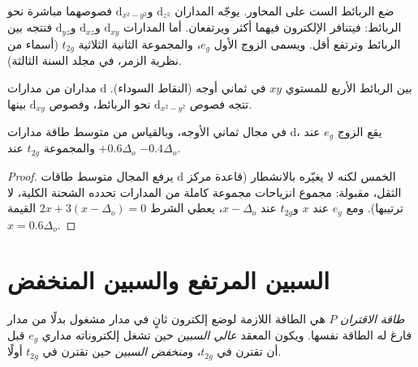 ضع الربائط الست على المحاور. يوجّه المداران $\mathrm d_{z^2}$ و$\mathrm d_{x^2-y^2}$
فصوصهما مباشرة نحو الربائط: فيتنافر الإلكترون فيهما أكثر
ويرتفعان. أما المدارات $\mathrm d_{xy}$ و$\mathrm d_{xz}$ و$\mathrm d_{yz}$ فتتجه بين
الربائط وترتفع أقل. ويسمى الزوج الأول $e_g$، والمجموعة الثانية الثلاثية
$t_{2g}$ (أسماء من نظرية الزمر، في مجلد السنة الثالثة).

\begin{omfigure}

{\small مداران من مدارات d بين الربائط الأربع للمستوي $xy$ في ثماني أوجه
(النقاط السوداء). تتجه فصوص $\mathrm d_{x^2-y^2}$ نحو الربائط، وفصوص
$\mathrm d_{xy}$ بينها.}
\end{omfigure}

\begin{theorem}\label{thm:b2:ligand-field:barycentre}
في مجال ثماني الأوجه، وبالقياس من متوسط طاقة مدارات d، يقع
الزوج $e_g$ عند $+0.6\Delta_o$ والمجموعة $t_{2g}$ عند $-0.4\Delta_o$.
\end{theorem}

\begin{proof}
يرفع المجال متوسط طاقات d الخمس لكنه لا يغيّره
بالانشطار (قاعدة مركز الثقل، مقبولة: مجموع انزياحات مجموعة كاملة من
المدارات تحدده الشحنة الكلية، لا ترتيبها). ومع $e_g$ عند $x$ 
و$t_{2g}$ عند $x - \Delta_o$، يعطي الشرط $2x + 3(x - \Delta_o) = 0$ القيمة $x = 0.6\Delta_o$.
\end{proof}

\section{السبين المرتفع والسبين المنخفض}

\begin{definition}\label{def:b2:ligand-field:spin}
\emph{طاقة الاقتران} $P$ هي الطاقة اللازمة لوضع إلكترون ثانٍ
في مدار مشغول بدلًا من مدار فارغ له الطاقة نفسها. ويكون
المعقد \emph{عالي السبين} حين تشغل إلكتروناته مداري $e_g$
قبل أن تقترن في $t_{2g}$، و\emph{منخفض السبين} حين تقترن في $t_{2g}$
أولًا.
\end{definition}

